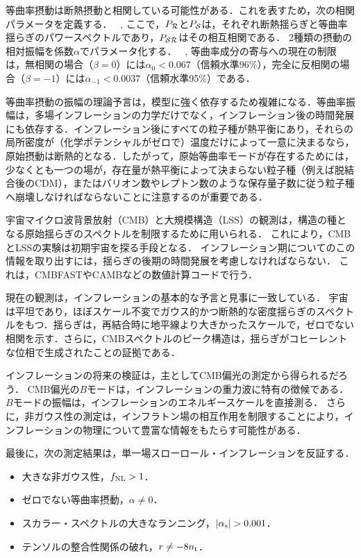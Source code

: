 等曲率摂動は断熱摂動と相関している可能性がある．これを表すため，次の相関パラメータを定義する．
\beq
\beta \equiv {}\, ,
\eeq
ここで，$P_{\cal R}$と$P_{\cal S}$は，それぞれ断熱揺らぎと等曲率揺らぎのパワースペクトルであり，$P_{{\cal S} {\cal R}}$はその相互相関である．
2種類の摂動の相対振幅を係数$\alpha$でパラメータ化する．
\beq
{} \equiv {}\, ,
\eeq
等曲率成分の寄与への現在の制限は，無相関の場合（$\beta =0$）には$\alpha_0 < 0.067$（信頼水準96\%），完全に反相関の場合（$\beta = -1$）には$\alpha_{-1} < 0.0037$（信頼水準95\%）である．

等曲率摂動の振幅の理論予言は，模型に強く依存するため複雑になる．等曲率振幅は，多場インフレーションの力学だけでなく，インフレーション後の時間発展にも依存する．インフレーション後にすべての粒子種が熱平衡にあり，それらの局所密度が（化学ポテンシャルがゼロで）温度だけによって一意に決まるなら，原始摂動は断熱的となる\cite{Lyth:2002my,Weinberg04b}．したがって，原始等曲率モードが存在するためには，少なくとも一つの場が，存在量が熱平衡によって決まらない粒子種（例えば脱結合後のCDM），またはバリオン数やレプトン数のような保存量子数に従う粒子種へ崩壊しなければならないことに注意するのが重要である．

\newpage
{}

\vskip 10pt
宇宙マイクロ波背景放射（CMB）と大規模構造（LSS）の観測は，構造の種となる原始揺らぎのスペクトルを制限するために用いられる．
これにより，CMBとLSSの実験は初期宇宙を探る手段となる．
インフレーション期についてのこの情報を取り出すには，揺らぎの後期の時間発展を考慮しなければならない．
これは，{\sf CMBFAST}や{\sf CAMB}などの数値計算コードで行う．

\vskip 6pt
現在の観測は，インフレーションの基本的な予言と見事に一致している．
宇宙は平坦であり，ほぼスケール不変でガウス的かつ断熱的な密度揺らぎのスペクトルをもつ．揺らぎは，再結合時に地平線より大きかったスケールで，ゼロでない相関を示す．さらに，CMBスペクトルのピーク構造は，揺らぎがコヒーレントな位相で生成されたことの証拠である．

\vskip 6pt
インフレーションの将来の検証は，主としてCMB偏光の測定から得られるだろう．
CMB偏光の$B$モードは，インフレーションの重力波に特有の徴候である．
$B$モードの振幅は，インフレーションのエネルギースケールを直接測る．
さらに，非ガウス性の測定は，インフラトン場の相互作用を制限することにより，インフレーションの物理について豊富な情報をもたらす可能性がある．

\vskip 6pt
最後に，次の測定結果は，単一場スローロール・インフレーションを反証する．
\begin{itemize}
\item 大きな非ガウス性，$f_{\rm NL} > 1$．
\item ゼロでない等曲率摂動，$\alpha \ne 0$．
\item スカラー・スペクトルの大きなランニング，$|\alpha_{\rm s}| > 0.001$．
\item テンソルの整合性関係の破れ，$r \ne - 8 n_{\rm t}$．
\end{itemize}






\newpage
